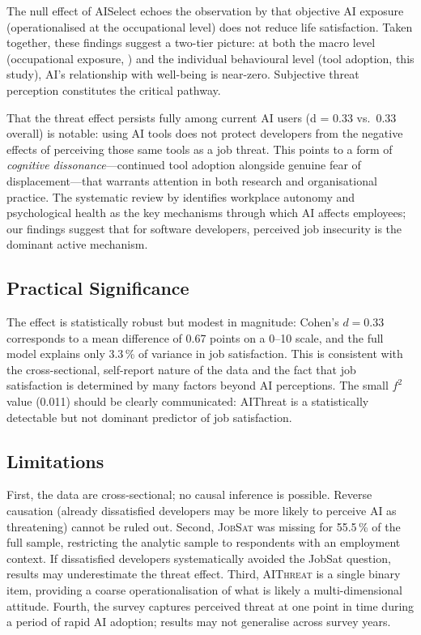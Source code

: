 \documentclass[11pt]{article}
\begin{document}
The null effect of AISelect echoes the observation by \citet{giuntella2025ai}
that objective AI exposure (operationalised at the occupational level) does
not reduce life satisfaction. Taken together, these findings suggest a
two-tier picture: at both the macro level (occupational exposure, \citealt{giuntella2025ai})
and the individual behavioural level (tool adoption, this study), AI's
relationship with well-being is near-zero. Subjective threat perception
constitutes the critical pathway.

That the threat effect persists fully among current AI users (d = 0.33 vs.\
0.33 overall) is notable: using AI tools does not protect developers from the
negative effects of perceiving those same tools as a job threat. This points
to a form of \emph{cognitive dissonance}—continued tool adoption alongside
genuine fear of displacement—that warrants attention in both research and
organisational practice. The systematic review by \citet{soulami2024exploring}
identifies workplace autonomy and psychological health as the key mechanisms
through which AI affects employees; our findings suggest that for software
developers, perceived job insecurity is the dominant active mechanism.

\subsection{Practical Significance}

The effect is statistically robust but modest in magnitude: Cohen's $d = 0.33$
corresponds to a mean difference of 0.67 points on a 0--10 scale, and the
full model explains only 3.3\,\% of variance in job satisfaction.
This is consistent with the cross-sectional, self-report nature of the data
and the fact that job satisfaction is determined by many factors beyond
AI perceptions. The small $f^2$ value (0.011) should be clearly
communicated: AIThreat is a statistically detectable but not dominant
predictor of job satisfaction.

\subsection{Limitations}

First, the data are cross-sectional; no causal inference is possible.
Reverse causation (already dissatisfied developers may be more likely to
perceive AI as threatening) cannot be ruled out.
Second, \textsc{JobSat} was missing for 55.5\,\% of the full sample,
restricting the analytic sample to respondents with an employment context.
If dissatisfied developers systematically avoided the JobSat question,
results may underestimate the threat effect.
Third, \textsc{AIThreat} is a single binary item, providing a coarse
operationalisation of what is likely a multi-dimensional attitude.
Fourth, the survey captures perceived threat at one point in time during a
period of rapid AI adoption; results may not generalise across survey years.
\end{document}
